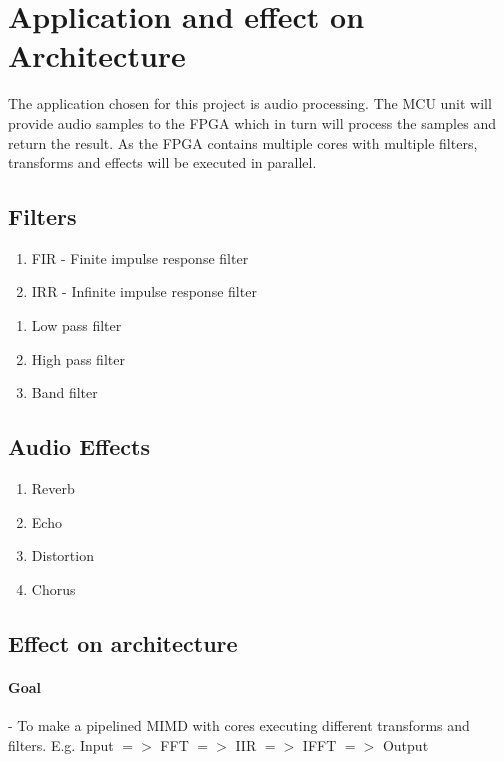 \section{Application and effect on Architecture}


The application chosen for this project is audio processing. The MCU unit will
provide audio samples to the FPGA which in turn will process the samples and
return the result. As the FPGA contains multiple cores with multiple filters,
transforms and effects will be executed in parallel.

\subsection{Filters}

\begin{enumerate}
	\item FIR - Finite impulse response filter
	\item IRR - Infinite impulse response filter
\end{enumerate}

\begin{enumerate}
	\item Low pass filter
	\item High pass filter
	\item Band filter
\end{enumerate}

\subsection{Audio Effects}

\begin{enumerate}
	\item Reverb
	\item Echo
	\item Distortion
	\item Chorus
\end{enumerate}

\subsection{Effect on architecture}

\paragraph{Goal}
 - To make a pipelined MIMD with cores executing different transforms and
filters.
   E.g. Input $=>$ FFT $=>$ IIR $=>$ IFFT $=>$ Output

